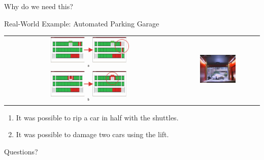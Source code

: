 \documentclass[aspectratio=1610]{beamer}
\begin{document}
  \begin{frame}[standout]
    Why do we need this?
  \end{frame}

  \begin{frame}{Real-World Example: Automated Parking Garage}
    \begin{tabular}{cc}
      \includegraphics[width=0.475\textwidth, valign=t]{parking_garage_errors.png}
      &
      \includegraphics[width=0.465\textwidth, valign=t]{parking_garage_enter.png}
    \end{tabular}

    \begin{enumerate}[label=(\alph*)]
      \item It was possible to rip a car in half with the shuttles.
      \item It was possible to damage two cars using the lift.
    \end{enumerate}
  \end{frame}

  \begin{frame}[standout]
    Questions?
  \end{frame}
\end{document}
